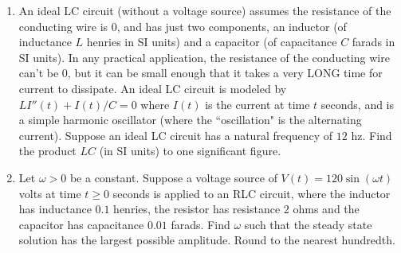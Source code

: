 \documentclass{ximera}
\begin{document}
\begin{enumerate}[label=(\arabic*)]



\newpage


\item An ideal LC circuit (without a voltage source) assumes the resistance of the conducting wire is $0$, and has just two components, an inductor (of inductance $L$ henries in SI units) and a capacitor (of capacitance $C$ farads in SI units).  In any practical application, the resistance of the conducting wire can't be $0$, but it can be small enough that it takes a very LONG time for current to dissipate.  An ideal LC circuit is modeled by $LI''(t)+I(t)/C=0$ where $I(t)$ is the current at time $t$ seconds, and is a simple harmonic oscillator (where the ``oscillation" is the alternating current).  Suppose an ideal LC circuit has a natural frequency of $12$ hz.  Find the product $LC$ (in SI units) to one significant figure.




\item Let $\omega>0$ be a constant. Suppose a voltage source of $V(t)=120 \sin(\omega t)$ volts at time $t\geq 0$ seconds is applied to an RLC circuit, where the inductor has inductance $0.1$ henries, the resistor has resistance $2$ ohms and the capacitor has capacitance $0.01$ farads.  Find $\omega$ such that the steady state solution has the largest possible amplitude.  Round to the nearest hundredth.





\end{enumerate}
\end{document}
